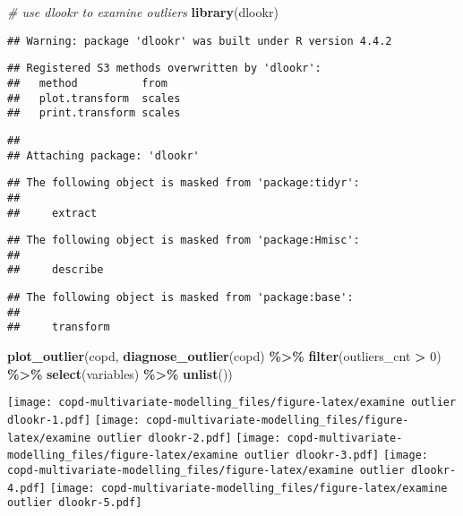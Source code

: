 \documentclass[
]{article}
\newenvironment{Shaded}{\begin{snugshade}}{\end{snugshade}}
\newcommand{\CommentTok}[1]{\textcolor[rgb]{0.56,0.35,0.01}{\textit{#1}}}
\newcommand{\DecValTok}[1]{\textcolor[rgb]{0.00,0.00,0.81}{#1}}
\newcommand{\FunctionTok}[1]{\textcolor[rgb]{0.13,0.29,0.53}{\textbf{#1}}}
\newcommand{\NormalTok}[1]{#1}
\newcommand{\SpecialCharTok}[1]{\textcolor[rgb]{0.81,0.36,0.00}{\textbf{#1}}}
\begin{document}
\begin{Shaded}
\begin{Highlighting}[]
\CommentTok{\# use dlookr to examine outliers}
\FunctionTok{library}\NormalTok{(dlookr)}
\end{Highlighting}
\end{Shaded}

\begin{verbatim}
## Warning: package 'dlookr' was built under R version 4.4.2
\end{verbatim}

\begin{verbatim}
## Registered S3 methods overwritten by 'dlookr':
##   method          from  
##   plot.transform  scales
##   print.transform scales
\end{verbatim}

\begin{verbatim}
## 
## Attaching package: 'dlookr'
\end{verbatim}

\begin{verbatim}
## The following object is masked from 'package:tidyr':
## 
##     extract
\end{verbatim}

\begin{verbatim}
## The following object is masked from 'package:Hmisc':
## 
##     describe
\end{verbatim}

\begin{verbatim}
## The following object is masked from 'package:base':
## 
##     transform
\end{verbatim}

\begin{Shaded}
\begin{Highlighting}[]
\FunctionTok{plot\_outlier}\NormalTok{(copd,}
             \FunctionTok{diagnose\_outlier}\NormalTok{(copd) }\SpecialCharTok{\%\textgreater{}\%}
                \FunctionTok{filter}\NormalTok{(outliers\_cnt }\SpecialCharTok{\textgreater{}} \DecValTok{0}\NormalTok{) }\SpecialCharTok{\%\textgreater{}\%}
                \FunctionTok{select}\NormalTok{(variables) }\SpecialCharTok{\%\textgreater{}\%}
                \FunctionTok{unlist}\NormalTok{())}
\end{Highlighting}
\end{Shaded}

\texttt{[image: copd-multivariate-modelling\_files/figure-latex/examine outlier dlookr-1.pdf]}
\texttt{[image: copd-multivariate-modelling\_files/figure-latex/examine outlier dlookr-2.pdf]}
\texttt{[image: copd-multivariate-modelling\_files/figure-latex/examine outlier dlookr-3.pdf]}
\texttt{[image: copd-multivariate-modelling\_files/figure-latex/examine outlier dlookr-4.pdf]}
\texttt{[image: copd-multivariate-modelling\_files/figure-latex/examine outlier dlookr-5.pdf]}
\end{document}
